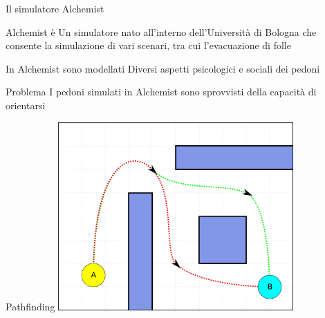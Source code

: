 \documentclass{beamer}
\begin{document}

\begin{frame}{Il simulatore Alchemist}
\begin{block}{Alchemist è}
Un simulatore nato all'interno dell'Università di Bologna che consente la simulazione di vari scenari, tra cui l'evacuazione di folle
\end{block}
\begin{block}{In Alchemist sono modellati}
Diversi aspetti psicologici e sociali dei pedoni
\end{block}
\begin{alertblock}{Problema}
I pedoni simulati in Alchemist sono sprovvisti della capacità di \textcolor{bostonuniversityred}{orientarsi}
\end{alertblock}
\end{frame}

\begin{frame}[fragile]{Pathfinding}
\hfil\hfil\includegraphics[width=9cm]{figures/pathfinding.png}
\end{frame}
\end{document}
